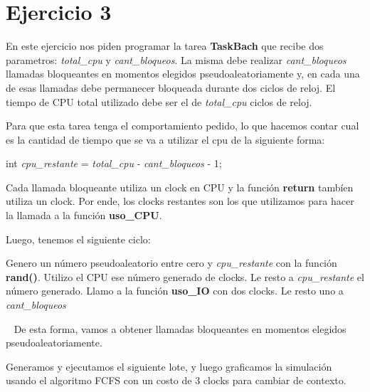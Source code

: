\section{Ejercicio 3}

En este ejercicio nos piden programar la tarea \textbf{TaskBach} que recibe dos parametros: \textit{total\_cpu} y \textit{cant\_bloqueos}. La misma debe realizar \textit{cant\_bloqueos} llamadas bloqueantes en momentos elegidos pseudoaleatoriamente y, en cada una de esas llamadas debe permanecer bloqueada durante dos ciclos de reloj. El tiempo de CPU total utilizado debe ser el de \textit{total\_cpu} ciclos de reloj.

Para que esta tarea tenga el comportamiento pedido, lo que hacemos contar cual es la cantidad de tiempo que se va a utilizar el cpu de la siguiente forma:

\begin{center}
		int \textit{cpu\_restante} = \textit{total\_cpu} - \textit{cant\_bloqueos} - 1;
\end{center}

Cada llamada bloqueante utiliza un clock en CPU y la función \textbf{return} tambíen utiliza un clock. Por ende, los clocks restantes son los que utilizamos para hacer la llamada a la función \textbf{uso\_CPU}.

Luego, tenemos el siguiente ciclo:

\begin{algorithmic}

	\State Genero un número pseudoaleatorio entre cero y \textit{cpu\_restante} con la función \textbf{rand()}.
		\State Utilizo el CPU ese número generado de clocks.
	\EndIf
	\State Le resto a \textit{cpu\_restante} el número generado.
	\State Llamo a la función \textbf{uso\_IO} con dos clocks.
	\State Le resto uno a \textit{cant\_bloqueos}
\EndWhile
\end{algorithmic}
~
De esta forma, vamos a obtener llamadas bloqueantes en momentos elegidos pseudoaleatoriamente.

Generamos y ejecutamos el siguiente lote, y luego graficamos la simulación usando el algoritmo FCFS con un costo de 3 clocks para cambiar de contexto.

